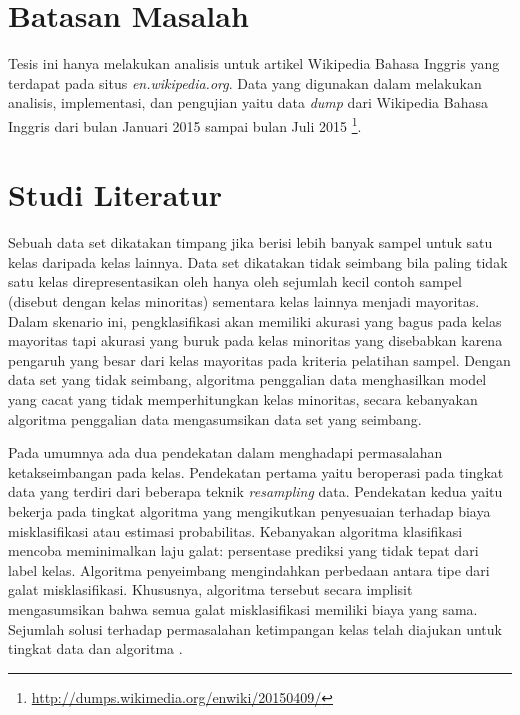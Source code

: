 \documentclass[12pt,a4paper,titlepage]{article}
\begin{document}
\section{Batasan Masalah}\label{sec:batasan-masalah}

Tesis ini hanya melakukan analisis untuk artikel Wikipedia Bahasa Inggris yang terdapat pada situs \textit{en.wikipedia.org}.
Data yang digunakan dalam melakukan analisis, implementasi, dan pengujian yaitu data \textit{dump} dari Wikipedia Bahasa Inggris dari bulan Januari 2015 sampai bulan Juli 2015
\footnote{\url{http://dumps.wikimedia.org/enwiki/20150409/}}.

\section{Studi Literatur}\label{sec:studi-literatur}

Sebuah data set dikatakan timpang jika berisi lebih banyak sampel untuk satu kelas daripada kelas lainnya.
Data set dikatakan tidak seimbang bila paling tidak satu kelas direpresentasikan oleh hanya oleh sejumlah kecil contoh sampel (disebut dengan kelas minoritas) sementara kelas lainnya menjadi mayoritas.
Dalam skenario ini, pengklasifikasi akan memiliki akurasi yang bagus pada kelas mayoritas tapi akurasi yang buruk pada kelas minoritas yang disebabkan karena pengaruh yang besar dari kelas mayoritas pada kriteria pelatihan sampel. 
Dengan data set yang tidak seimbang, algoritma penggalian data menghasilkan model yang cacat yang tidak memperhitungkan kelas minoritas, secara kebanyakan algoritma penggalian data mengasumsikan data set yang seimbang.

Pada umumnya ada dua pendekatan dalam menghadapi permasalahan ketakseimbangan pada kelas.
Pendekatan pertama yaitu beroperasi pada tingkat data yang terdiri dari beberapa teknik \textit{resampling} data. 
Pendekatan kedua yaitu bekerja pada tingkat algoritma yang mengikutkan penyesuaian terhadap biaya misklasifikasi atau estimasi probabilitas.
Kebanyakan algoritma klasifikasi mencoba meminimalkan laju galat: persentase prediksi yang tidak tepat dari label kelas.
Algoritma penyeimbang mengindahkan perbedaan antara tipe dari galat misklasifikasi.
Khususnya, algoritma tersebut secara implisit mengasumsikan bahwa semua galat misklasifikasi memiliki biaya yang sama.
Sejumlah solusi terhadap permasalahan ketimpangan kelas telah diajukan untuk tingkat data dan algoritma \cite{chawla2004editorial}.
\end{document}
